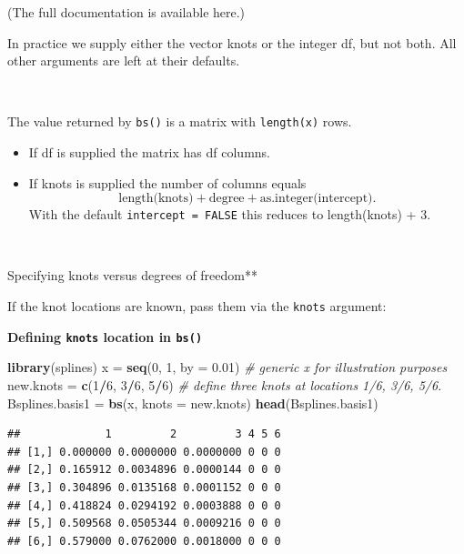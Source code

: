 \documentclass[
]{book}
\newenvironment{Shaded}{\begin{snugshade}}{\end{snugshade}}
\newcommand{\AttributeTok}[1]{\textcolor[rgb]{0.13,0.29,0.53}{#1}}
\newcommand{\CommentTok}[1]{\textcolor[rgb]{0.56,0.35,0.01}{\textit{#1}}}
\newcommand{\DecValTok}[1]{\textcolor[rgb]{0.00,0.00,0.81}{#1}}
\newcommand{\FloatTok}[1]{\textcolor[rgb]{0.00,0.00,0.81}{#1}}
\newcommand{\FunctionTok}[1]{\textcolor[rgb]{0.13,0.29,0.53}{\textbf{#1}}}
\newcommand{\NormalTok}[1]{#1}
\newcommand{\OtherTok}[1]{\textcolor[rgb]{0.56,0.35,0.01}{#1}}
\newcommand{\SpecialCharTok}[1]{\textcolor[rgb]{0.81,0.36,0.00}{\textbf{#1}}}
\begin{document}
(The full documentation is available here.)

In practice we supply either the vector knots or the integer df, but not both. All other arguments are left at their defaults.

~

The value returned by \texttt{bs()} is a matrix with \texttt{length(x)} rows.

\begin{itemize}
\item
  If df is supplied the matrix has df columns.
\item
  If knots is supplied the number of columns equals
  \[\text{length(knots)} + \text{degree} + \text{as.integer(intercept)}.\]
  With the default \texttt{intercept\ =\ FALSE} this reduces to length(knots) + 3.
\end{itemize}

~

Specifying knots versus degrees of freedom**

If the knot locations are known, pass them via the \texttt{knots} argument:

\textbf{Defining \texttt{knots} location in \texttt{bs()}}
~

\begin{Shaded}
\begin{Highlighting}[]
\FunctionTok{library}\NormalTok{(splines)}
\NormalTok{x }\OtherTok{=} \FunctionTok{seq}\NormalTok{(}\DecValTok{0}\NormalTok{, }\DecValTok{1}\NormalTok{, }\AttributeTok{by =} \FloatTok{0.01}\NormalTok{)  }\CommentTok{\# generic \textasciigrave{}x\textasciigrave{} for illustration purposes}
\NormalTok{new.knots }\OtherTok{=} \FunctionTok{c}\NormalTok{(}\DecValTok{1}\SpecialCharTok{/}\DecValTok{6}\NormalTok{, }\DecValTok{3}\SpecialCharTok{/}\DecValTok{6}\NormalTok{, }\DecValTok{5}\SpecialCharTok{/}\DecValTok{6}\NormalTok{)  }\CommentTok{\# define three knots at locations 1/6, 3/6, 5/6.}
\NormalTok{Bsplines.basis1 }\OtherTok{=} \FunctionTok{bs}\NormalTok{(x, }\AttributeTok{knots =}\NormalTok{ new.knots)}
\FunctionTok{head}\NormalTok{(Bsplines.basis1)}
\end{Highlighting}
\end{Shaded}

\begin{verbatim}
##             1         2         3 4 5 6
## [1,] 0.000000 0.0000000 0.0000000 0 0 0
## [2,] 0.165912 0.0034896 0.0000144 0 0 0
## [3,] 0.304896 0.0135168 0.0001152 0 0 0
## [4,] 0.418824 0.0294192 0.0003888 0 0 0
## [5,] 0.509568 0.0505344 0.0009216 0 0 0
## [6,] 0.579000 0.0762000 0.0018000 0 0 0
\end{verbatim}
\end{document}
